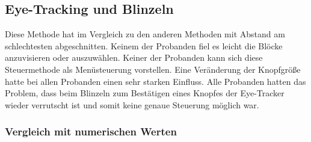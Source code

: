 \subsection{Eye-Tracking und Blinzeln}
Diese Methode hat im Vergleich zu den anderen Methoden mit Abstand am schlechtesten abgeschnitten. Keinem der Probanden fiel es leicht die Blöcke anzuvisieren oder auszuwählen. Keiner der Probanden kann sich diese Steuermethode als Menüsteuerung vorstellen. Eine Veränderung der Knopfgröße hatte bei allen Probanden einen sehr starken Einfluss. Alle Probanden hatten das Problem, dass beim Blinzeln zum Bestätigen eines Knopfes der Eye-Tracker wieder verrutscht ist und somit keine genaue Steuerung möglich war. 
\subsubsection{Vergleich mit numerischen Werten}
